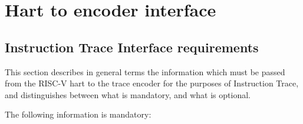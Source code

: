 \chapter{Hart to encoder interface} \label{Interface}

\section{Instruction Trace Interface requirements}\label{sec:InstructionInterfaceRequirements}

This section describes in general terms the information which must be
passed from the RISC-V hart to the trace encoder for the purposes of
Instruction Trace, and distinguishes between what is mandatory, and
what is optional.

The following information is mandatory:

